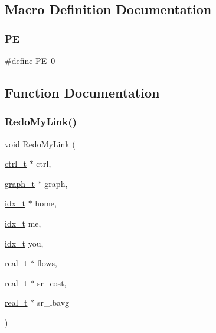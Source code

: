 \subsection{Macro Definition Documentation}
\mbox{\label{a00392_a211238ffe3627f42ca7b04bc96cc8fa6}} 
\subsubsection{\texorpdfstring{PE}{PE}}
{\footnotesize\ttfamily \#define PE~0}



\subsection{Function Documentation}
\mbox{\label{a00392_a33598690c13a8a70b245a84d07631bfb}} 
\subsubsection{\texorpdfstring{Redo\+My\+Link()}{RedoMyLink()}}
{\footnotesize\ttfamily void Redo\+My\+Link (\begin{DoxyParamCaption}\item[{\hyperlink{a00742}{ctrl\+\_\+t} $\ast$}]{ctrl,  }\item[{\hyperlink{a00734}{graph\+\_\+t} $\ast$}]{graph,  }\item[{\hyperlink{a00876_aaa5262be3e700770163401acb0150f52}{idx\+\_\+t} $\ast$}]{home,  }\item[{\hyperlink{a00876_aaa5262be3e700770163401acb0150f52}{idx\+\_\+t}}]{me,  }\item[{\hyperlink{a00876_aaa5262be3e700770163401acb0150f52}{idx\+\_\+t}}]{you,  }\item[{\hyperlink{a00876_a1924a4f6907cc3833213aba1f07fcbe9}{real\+\_\+t} $\ast$}]{flows,  }\item[{\hyperlink{a00876_a1924a4f6907cc3833213aba1f07fcbe9}{real\+\_\+t} $\ast$}]{sr\+\_\+cost,  }\item[{\hyperlink{a00876_a1924a4f6907cc3833213aba1f07fcbe9}{real\+\_\+t} $\ast$}]{sr\+\_\+lbavg }\end{DoxyParamCaption})}


